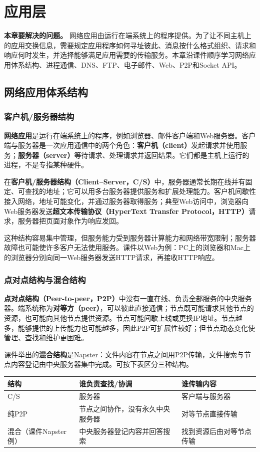 \chapter{应用层}

\noindent\textbf{本章要解决的问题。} 网络应用由运行在端系统上的程序提供。为了让不同主机上的应用交换信息，需要规定应用程序如何寻址彼此、消息按什么格式组织、请求和响应何时发生，并选择能够满足应用需要的传输服务。本章沿课件顺序学习网络应用体系结构、进程通信、DNS、FTP、电子邮件、Web、P2P和Socket API。

\section{网络应用体系结构}
\subsection{客户机/服务器结构}
\textbf{网络应用}是运行在端系统上的程序，例如浏览器、邮件客户端和Web服务器。客户端与服务器是一次应用通信中的两个角色：\textbf{客户机（client）}发起请求并使用服务；\textbf{服务器（server）}等待请求、处理请求并返回结果。它们都是主机上运行的进程，不是专指某种硬件。

在\textbf{客户机/服务器结构（Client--Server，C/S）}中，服务器通常长期在线并有固定、可查找的地址；它可以用多台服务器提供服务和扩展处理能力。客户机间歇性接入网络，地址可能变化，并通过服务器取得服务；典型Web访问中，浏览器向Web服务器发送\textbf{超文本传输协议（HyperText Transfer Protocol，HTTP）}请求，服务器把页面对象作为响应发回。

这种结构容易集中管理，但服务能力受到服务器计算能力和网络带宽限制；服务器故障也可能使许多客户无法使用服务。课件以Web为例：PC上的浏览器和Mac上的浏览器分别向同一Web服务器发送HTTP请求，再接收HTTP响应。

\subsection{点对点结构与混合结构}
\textbf{点对点结构（Peer-to-peer，P2P）}中没有一直在线、负责全部服务的中央服务器。端系统称为\textbf{对等方（peer）}，可以彼此直接通信；节点既可能请求其他节点的资源，也可能向其他节点提供资源。节点可能间歇上线或更换IP地址。节点越多，能够提供的上传能力也可能越多，因此P2P可扩展性较好；但节点动态变化使管理、查找和维护更困难。

课件举出的\textbf{混合结构}是Napster：文件内容在节点之间用P2P传输，文件搜索与节点内容登记由中央服务器集中完成。可按下表区分三种结构。

\begin{center}\begin{tabularx}{.96\textwidth}{lXX}\toprule
结构 & 谁负责查找/协调 & 谁传输内容 \\\midrule
C/S & 服务器 & 客户端与服务器 \\
纯P2P & 节点之间协作，没有永久中央服务器 & 对等节点直接传输 \\
混合（课件Napster例） & 中央服务器登记内容并回答搜索 & 找到资源后由对等节点传输 \\\bottomrule\end{tabularx}\end{center}

